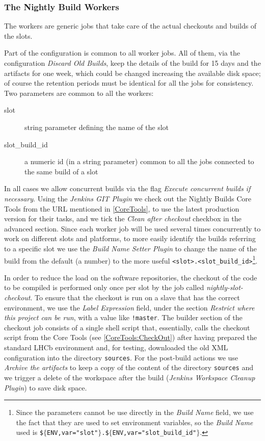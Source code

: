 \documentclass{lhcbnote}
\begin{document}
\subsubsection{The Nightly Build Workers}
\label{Jenkins:Workers}
The workers are generic jobs that take care of the actual checkouts and builds
of the slots.

Part of the configuration is common to all worker jobs.  All of them, via the
configuration \emph{Discard Old Builds}, keep the details of the build for 15
days and the artifacts for one week, which could be changed increasing the
available disk space; of course the retention periods must be identical for all
the jobs for consistency.  Two parameters are common to all the workers:
\begin{description}
  \item[slot] string parameter defining the name of the slot
  \item[slot\_build\_id] a numeric id (in a string parameter) common to all the
jobs connected to the same build of a slot
\end{description}
In all cases we allow concurrent builds via the flag \emph{Execute concurrent
builds if necessary}.  Using the \emph{Jenkins GIT Plugin} we check out the
Nightly Builds Core Tools from the URL mentioned in \ref{CoreTools}, to use the
latest production version for their tasks, and we tick the \emph{Clean after
checkout} checkbox in the advanced section.  Since each worker job will be used
several times concurrently to work on different slots and platforms, to more
easily identify the builds referring to a specific slot we use the \emph{Build
Name Setter Plugin} to change the name of the build from the default (a number)
to the more useful \verb|<slot>.<slot_build_id>|\footnote{Since the parameters
cannot be use directly in the \emph{Build Name} field, we use the fact that they
are used to set environment variables, so the \emph{Build Name} used is
\texttt{\$$\{$ENV,var="slot"$\}$.\$$\{$ENV,var="slot\_build\_id"$\}$}.}.

In order to reduce the load on the software repositories, the checkout of the
code to be compiled is performed only once per slot by the job called
\emph{nightly-slot-checkout}.  To ensure that the checkout is run on a slave
that has the correct environment, we use the \emph{Label Expression} field,
under the section \emph{Restrict where this project can be run}, with a value
like \verb|!master|.  The builder section of the checkout job consists of a
single shell script that, essentially, calls the checkout script from the Core
Tools (see \ref{CoreTools:CheckOut}) after having prepared the standard LHCb
environment and, for testing, downloaded the old XML configuration into the
directory \texttt{sources}.  For the post-build actions we use \emph{Archive the
artifacts} to keep a copy of the content of the directory \texttt{sources} and
we trigger a delete of the workspace after the build (\emph{Jenkins Workspace
Cleanup Plugin}) to save disk space.
\end{document}
